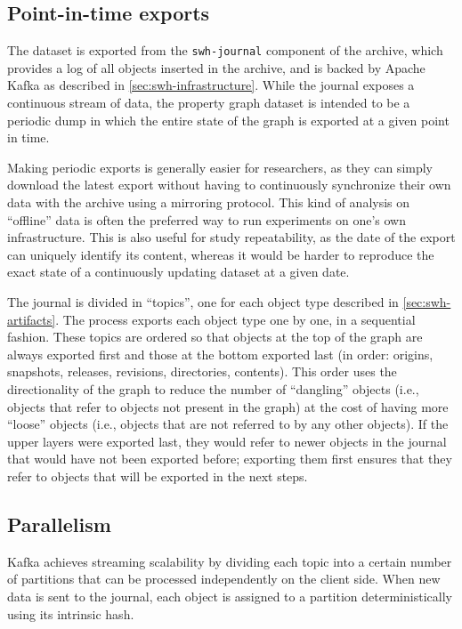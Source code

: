 \subsection{Point-in-time exports}

The dataset is exported from the \texttt{swh-journal} component of the archive,
which provides a log of all objects inserted in the archive, and is backed
by Apache Kafka as described in \cref{sec:swh-infrastructure}. While the
journal exposes a continuous stream of data, the property graph dataset is
intended to be a periodic dump in which the entire state of the graph is
exported at a given point in time.

Making periodic exports is generally easier for researchers, as they can
simply download the latest export without having to continuously synchronize
their own data with the archive using a mirroring protocol. This kind of
analysis on ``offline'' data is often the preferred way to run experiments on
one's own infrastructure. This is also useful for study repeatability, as the
date of the export can uniquely identify its content, whereas it would be
harder to reproduce the exact state of a continuously updating dataset at a
given date.

The journal is divided in ``topics'', one for each object type described
in \cref{sec:swh-artifacts}. The process exports each object type one by
one, in a sequential fashion. These topics are ordered so that objects at the
top of the graph are always exported first and those at the bottom exported
last (in order: origins, snapshots, releases, revisions, directories,
contents). This order uses the directionality of the graph to reduce the number
of ``dangling'' objects (i.e., objects that refer to objects not present in the
graph) at the cost of having more ``loose'' objects (i.e., objects that are not
referred to by any other objects). If the upper layers were exported last, they
would refer to newer objects in the journal that would have not been exported
before; exporting them first ensures that they refer to objects that will be
exported in the next steps.

\subsection{Parallelism}

Kafka achieves streaming scalability by dividing each topic into a certain
number of partitions that can be processed independently on the client side.
When new data is sent to the journal, each object is assigned to a partition
deterministically using its intrinsic hash.

